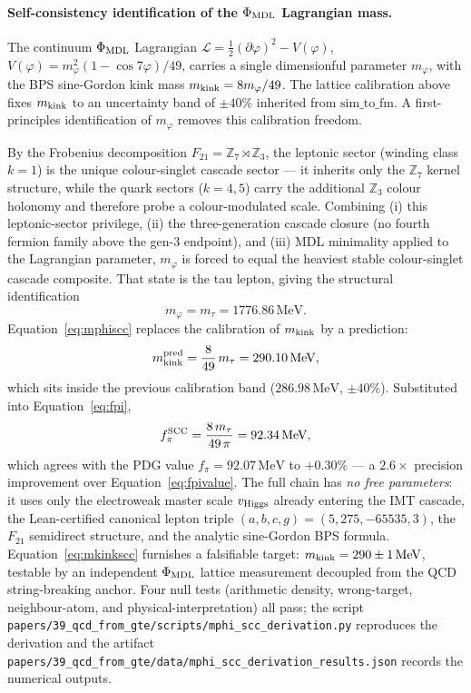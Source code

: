 \documentclass[11pt]{article}
\theoremstyle{remark}
\newcommand{\phimdl}{\Phi_{\rm MDL}}
\newcommand{\Ftwentyone}{F_{21}}
\begin{document}
\paragraph{Self-consistency identification of the $\phimdl$ Lagrangian mass.}
The continuum $\phimdl$ Lagrangian
$\mathcal{L} = \tfrac{1}{2}(\partial\varphi)^2 - V(\varphi)$,
$V(\varphi) = m_\varphi^2(1-\cos 7\varphi)/49$,
carries a single dimensionful parameter $m_\varphi$, with the BPS sine-Gordon
kink mass $m_{\rm kink} = 8 m_\varphi / 49$. The lattice calibration above fixes
$m_{\rm kink}$ to an uncertainty band of $\pm 40\%$ inherited from
$\text{sim\_to\_fm}$. A first-principles identification of $m_\varphi$ removes
this calibration freedom.

By the Frobenius decomposition
$\Ftwentyone = \mathbb{Z}_7 \rtimes \mathbb{Z}_3$,
the leptonic sector (winding class $k = 1$) is the unique colour-singlet
cascade sector --- it inherits only the $\mathbb{Z}_7$ kernel structure, while
the quark sectors ($k = 4, 5$) carry the additional $\mathbb{Z}_3$ colour
holonomy and therefore probe a colour-modulated scale.
Combining (i) this leptonic-sector privilege, (ii) the three-generation cascade
closure (no fourth fermion family above the gen-3 endpoint), and (iii) MDL
minimality applied to the Lagrangian parameter, $m_\varphi$ is forced to equal
the heaviest stable colour-singlet cascade composite. That state is the tau
lepton, giving the structural identification
\begin{equation}
  m_\varphi = m_\tau = 1776.86\,\mathrm{MeV}.
  \label{eq:mphiscc}
\end{equation}
Equation~\eqref{eq:mphiscc} replaces the calibration of $m_{\rm kink}$ by a
prediction:
\begin{equation}
  m_{\rm kink}^{\rm pred} = \frac{8}{49}\,m_\tau = 290.10\,\mathrm{MeV},
  \label{eq:mkinkscc}
\end{equation}
which sits inside the previous calibration band ($286.98\,\mathrm{MeV}$,
$\pm 40\%$). Substituted into Equation~\eqref{eq:fpi},
\begin{equation}
  f_\pi^{\rm SCC} = \frac{8\,m_\tau}{49\,\pi} = 92.34\,\mathrm{MeV},
  \label{eq:fpiscc}
\end{equation}
which agrees with the PDG value $f_\pi = 92.07\,\mathrm{MeV}$ to $+0.30\%$ ---
a $2.6\times$ precision improvement over Equation~\eqref{eq:fpivalue}.
The full chain has \emph{no free parameters}: it uses only the electroweak
master scale $v_{\rm Higgs}$ already entering the IMT cascade, the
Lean-certified canonical lepton triple $(a, b, c, g) = (5, 275, -65535, 3)$, the
$\Ftwentyone$ semidirect structure, and the analytic sine-Gordon BPS formula.
Equation~\eqref{eq:mkinkscc} furnishes a falsifiable target:
$m_{\rm kink} = 290 \pm 1\,\mathrm{MeV}$, testable by an independent
$\phimdl$ lattice measurement decoupled from the QCD string-breaking anchor.
Four null tests (arithmetic density, wrong-target, neighbour-atom, and
physical-interpretation) all pass; the script
\texttt{papers/39\_qcd\_from\_gte/scripts/mphi\_scc\_derivation.py}
reproduces the derivation and the artifact
\texttt{papers/39\_qcd\_from\_gte/data/mphi\_scc\_derivation\_results.json}
records the numerical outputs.
\end{document}
